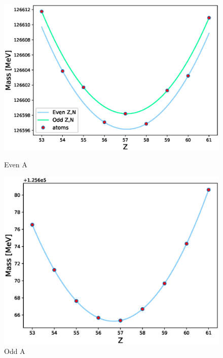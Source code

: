 \begin{figure}
    \centering
    \begin{minipage}{0.4\textwidth}
        \includegraphics[scale=0.42]{ex2/evenA.eps}
        \caption{Even A}
        \label{fig:even}
    \end{minipage}
    \hspace{0.1\textwidth}
    \begin{minipage}{0.4\textwidth}
        \includegraphics[scale=0.4]{ex2/oddA.eps}
        \caption{Odd A}
        \label{fig:odd}
    \end{minipage}
    
\end{figure}